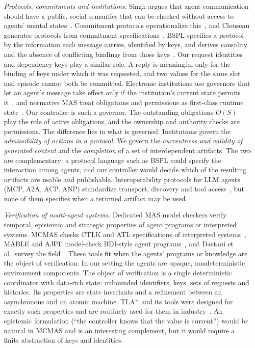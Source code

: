 \emph{Protocols, commitments and institutions.} Singh argues that agent communication should have a public, social semantics that can be checked without access to agents' mental states~\cite{singh1998acl}. Commitment protocols operationalize this~\cite{yolum2002commitments}, and Clouseau generates protocols from commitment specifications~\cite{singh2020clouseau}. BSPL specifies a protocol by the information each message carries, identified by keys, and derives causality and the absence of conflicting bindings from those keys~\cite{singh2011bspl,chopra2020protocols}. Our request identities and dependency keys play a similar role. A reply is meaningful only for the binding of keys under which it was requested, and two values for the same slot and episode cannot both be committed. Electronic institutions use governors that let an agent's message take effect only if the institution's current state permits it~\cite{esteva2001institutions,arcos2005institutions}, and normative MAS treat obligations and permissions as first-class runtime state~\cite{boella2006normative}. Our controller is such a governor. The outstanding obligations $O(S)$ play the role of active obligations, and the ownership and authority checks are permissions. The difference lies in what is governed. Institutions govern the \emph{admissibility of actions in a protocol}. We govern the \emph{currentness and validity of generated content} and the \emph{completion} of a set of interdependent artifacts. The two are complementary: a protocol language such as BSPL could specify the interaction among agents, and our controller would decide which of the resulting artifacts are usable and publishable. Interoperability protocols for LLM agents (MCP, A2A, ACP, ANP) standardize transport, discovery and tool access~\cite{mcp,ehtesham2025protocols}, but none of them specifies when a returned artifact may be used.

\emph{Verification of multi-agent systems.} Dedicated MAS model checkers verify temporal, epistemic and strategic properties of agent programs or interpreted systems. MCMAS checks CTLK and ATL specifications of interpreted systems~\cite{lomuscio2017mcmas}, MABLE and AJPF model-check BDI-style agent programs~\cite{wooldridge2002mable,bordini2006verifying,dennis2012ajpf}, and Dastani et al.\ survey the field~\cite{dastani2010verification}. These tools fit when the agents' programs or knowledge are the object of verification. In our setting the agents are opaque, nondeterministic environment components. The object of verification is a single deterministic coordinator with data-rich state: unbounded identifiers, keys, sets of requests and histories. Its properties are state invariants and a refinement between an asynchronous and an atomic machine. TLA$^+$ and its tools were designed for exactly such properties and are routinely used for them in industry~\cite{newcombe2015aws,howard2025smartcasual}. An epistemic formulation (``the controller knows that the value is current'') would be natural in MCMAS and is an interesting complement, but it would require a finite abstraction of keys and identities.

